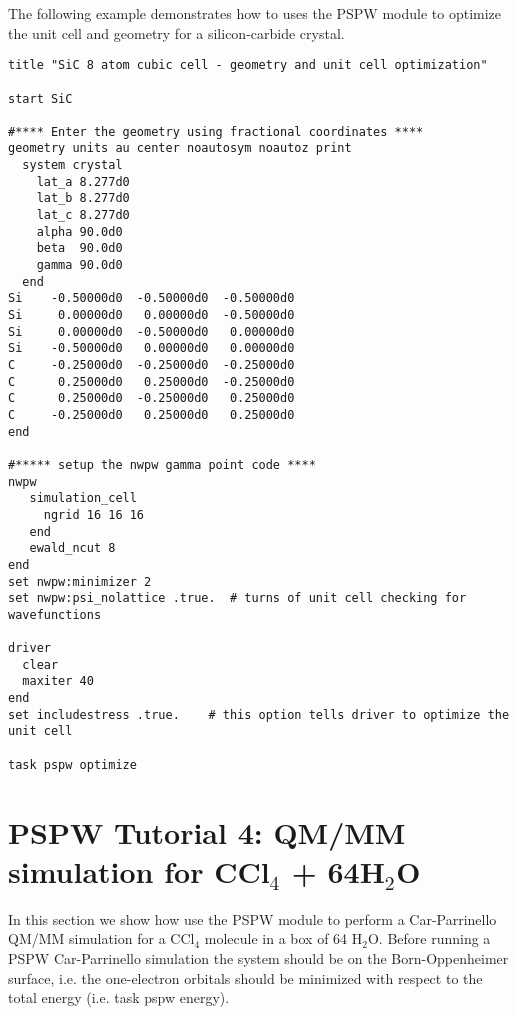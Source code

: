 The following example demonstrates how to uses the PSPW module to optimize the unit cell
and geometry for a silicon-carbide crystal.

\begin{verbatim}
title "SiC 8 atom cubic cell - geometry and unit cell optimization"

start SiC

#**** Enter the geometry using fractional coordinates ****
geometry units au center noautosym noautoz print
  system crystal
    lat_a 8.277d0
    lat_b 8.277d0
    lat_c 8.277d0
    alpha 90.0d0
    beta  90.0d0
    gamma 90.0d0
  end
Si    -0.50000d0  -0.50000d0  -0.50000d0
Si     0.00000d0   0.00000d0  -0.50000d0
Si     0.00000d0  -0.50000d0   0.00000d0
Si    -0.50000d0   0.00000d0   0.00000d0
C     -0.25000d0  -0.25000d0  -0.25000d0
C      0.25000d0   0.25000d0  -0.25000d0
C      0.25000d0  -0.25000d0   0.25000d0
C     -0.25000d0   0.25000d0   0.25000d0
end

#***** setup the nwpw gamma point code ****
nwpw
   simulation_cell
     ngrid 16 16 16
   end
   ewald_ncut 8
end
set nwpw:minimizer 2
set nwpw:psi_nolattice .true.  # turns of unit cell checking for wavefunctions

driver
  clear
  maxiter 40
end
set includestress .true.    # this option tells driver to optimize the unit cell

task pspw optimize

\end{verbatim}

\normalsize
\section{PSPW Tutorial 4: QM/MM simulation for CCl$_4$ + 64H$_2$O}
\label{sec:pspw_qmmm_simulation}

In this section we show how use the PSPW module to perform a Car-Parrinello
QM/MM simulation for a CCl$_4$ molecule in a box of 64 H$_2$O.
Before running a PSPW Car-Parrinello  simulation the system should be
on the Born-Oppenheimer surface, i.e. the one-electron orbitals should be minimized
with respect to the total energy (i.e. task pspw energy).  

